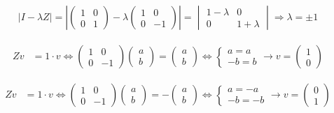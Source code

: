\documentclass[12pt]{article}
\begin{document}
\begin{equation*}
\begin{aligned}
| I - \lambda Z |
=
\left|
\begin{pmatrix}
1 & 0 \\ 
0 & 1 
\end{pmatrix}
- \lambda
\begin{pmatrix}
1 & 0 \\ 
0 & -1 
\end{pmatrix}
\right|
=
\begin{vmatrix}
1 -\lambda & 0 \\ 
0 & 1 + \lambda 
\end{vmatrix}
\Rightarrow
\lambda = \pm 1
\end{aligned}
\end{equation*}


\begin{equation*}
\begin{aligned}
Zv & = 1 \cdot v \Leftrightarrow 
\begin{pmatrix}
1 & 0 \\ 
0 & -1 
\end{pmatrix}
\begin{pmatrix}
a \\ 
b 
\end{pmatrix}
=
\begin{pmatrix}
a \\ 
b 
\end{pmatrix}
\Leftrightarrow 
\begin{cases}
a = a \\
-b = b
\end{cases}
\rightarrow
v = 
\begin{pmatrix}
1 \\ 
0
\end{pmatrix}
\end{aligned}
\end{equation*}


\begin{equation*}
\begin{aligned}
Zv & = 1 \cdot v \Leftrightarrow 
\begin{pmatrix}
1 & 0 \\ 
0 & -1 
\end{pmatrix}
\begin{pmatrix}
a \\ 
b 
\end{pmatrix}
=
- \begin{pmatrix}
a \\ 
b 
\end{pmatrix}
\Leftrightarrow 
\begin{cases}
a = -a \\
-b = -b
\end{cases}
\rightarrow
v = 
\begin{pmatrix}
0 \\ 
1 
\end{pmatrix}
\end{aligned}
\end{equation*}
\end{document}

